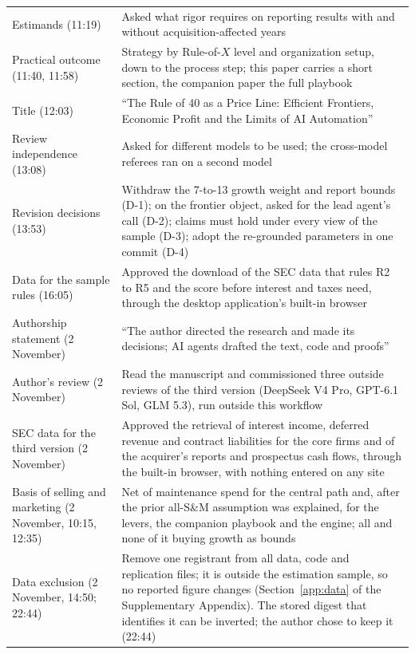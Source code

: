 {\begin{longtable}{@{}p{}p{}@{}}
Estimands (11:19) & Asked what rigor requires on reporting results with and without acquisition-affected years\\
Practical outcome (11:40, 11:58) & Strategy by Rule-of-$X$ level and organization setup, down to the process step; this paper carries a short section, the companion paper the full playbook\\
Title (12:03) & ``The Rule of 40 as a Price Line: Efficient Frontiers, Economic Profit and the Limits of AI Automation''\\
Review independence (13:08) & Asked for different models to be used; the cross-model referees ran on a second model\\
Revision decisions (13:53) & Withdraw the 7-to-13 growth weight and report bounds (D-1); on the frontier object, asked for the lead agent's call (D-2); claims must hold under every view of the sample (D-3); adopt the re-grounded parameters in one commit (D-4)\\
Data for the sample rules (16:05) & Approved the download of the SEC data that rules R2 to R5 and the score before interest and taxes need, through the desktop application's built-in browser\\
Authorship statement (2 November) & ``The author directed the research and made its decisions; AI agents drafted the text, code and proofs''\\
Author's review (2 November) & Read the manuscript and commissioned three outside reviews of the third version (DeepSeek V4 Pro, GPT-6.1 Sol, GLM 5.3), run outside this workflow\\
SEC data for the third version (2 November) & Approved the retrieval of interest income, deferred revenue and contract liabilities for the core firms and of the acquirer's reports and prospectus cash flows, through the built-in browser, with nothing entered on any site\\
Basis of selling and marketing (2 November, 10:15, 12:35) & Net of maintenance spend for the central path and, after the prior all-S\&M assumption was explained, for the levers, the companion playbook and the engine; all and none of it buying growth as bounds\\
Data exclusion (2 November, 14:50; 22:44) & Remove one registrant from all data, code and replication files; it is outside the estimation sample, so no reported figure changes (Section~\ref{app:data} of the Supplementary Appendix). The stored digest that identifies it can be inverted; the author chose to keep it (22:44)\\

\end{longtable}}
